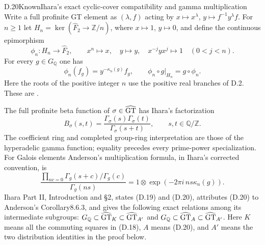 \begin{statement}{D.20}{Known}{Ihara's exact cyclic-cover compatibility and gamma multiplication}
Write a full profinite GT element as $(\lambda,f)$ acting by
$x\mapsto x^\lambda$, $y\mapsto f^{-1}y^\lambda f$.
For $n\geq1$ let $H_n=\ker(\widehat F_2\to\mathbb Z/n)$, where $x\mapsto1$, $y\mapsto0$, and define the continuous epimorphism
\[
 \phi_n:H_n\longrightarrow\widehat F_2,\qquad
 x^n\mapsto x,\quad y\mapsto y,\quad x^{-j}yx^j\mapsto1\quad(0<j<n).
\]
For every $g\in G_{\mathbb Q}$ one has
\[
 \phi_n(f_g)=y^{-\kappa_n(g)}f_g,\qquad
 \phi_n\circ g|_{H_n}=g\circ\phi_n .                         \tag{D.18}
\]
Here the roots of the positive integer $n$ use the positive real branches of D.2. These are \cite[Theorem1 and Proposition1]{dIhara2000}.

The full profinite beta function of $\sigma\in\widehat{\rm GT}$ has Ihara's factorization
\[
 B_\sigma(s,t)=\frac{\Gamma_\sigma(s)\Gamma_\sigma(t)}{\Gamma_\sigma(s+t)},
 \qquad s,t\in\mathbb Q/\mathbb Z.                          \tag{D.19}
\]
The coefficient ring and completed group-ring interpretation are those of the hyperadelic gamma function; equality precedes every prime-power specialization. For Galois elements Anderson's multiplication formula, in Ihara's corrected convention, is
\[
 \frac{\prod_{nc=0}\Gamma_g(s+c)/\Gamma_g(c)}{\Gamma_g(ns)}
       =1\otimes\exp(-2\pi i\,ns\kappa_n(g)).                 \tag{D.20}
\]
Ihara Part II, Introduction and \S2, states (D.19) and (D.20), attributes (D.20) to Anderson's Corollary8.6.3, and gives the following exact relations among its intermediate subgroups:
$G_{\mathbb Q}\subset\widehat{\rm GT}_K\subset\widehat{\rm GT}_{A'}$ and
$G_{\mathbb Q}\subset\widehat{\rm GT}_A\subset\widehat{\rm GT}_{A'}$.
Here $K$ means all the commuting squares in (D.18), $A$ means (D.20), and $A'$ means the two distribution identities in the proof below.
\end{statement}
